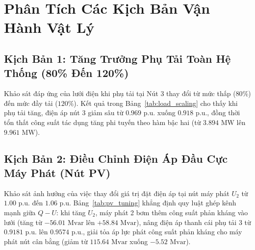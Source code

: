 \documentclass[12pt,a4paper,oneside]{report}
\begin{document}
\section{Phân Tích Các Kịch Bản Vận Hành Vật Lý}

\subsection{Kịch Bản 1: Tăng Trưởng Phụ Tải Toàn Hệ Thống (80\% Đến 120\%)}
Khảo sát đáp ứng của lưới điện khi phụ tải tại Nút 3 thay đổi từ mức thấp ($80\%$) đến mức đầy tải ($120\%$). Kết quả trong Bảng~\ref{tab:load_scaling} cho thấy khi phụ tải tăng, điện áp nút 3 giảm sâu từ $0.969\text{ p.u.}$ xuống $0.918\text{ p.u.}$, đồng thời tổn thất công suất tác dụng tăng phi tuyến theo hàm bậc hai (từ $3.894\text{ MW}$ lên $9.961\text{ MW}$).

\begin{table}[H]
\centering
\caption{Đáp ứng trào lưu công suất khi phụ tải hệ thống thay đổi.}
\label{tab:load_scaling}
\end{table}

\subsection{Kịch Bản 2: Điều Chỉnh Điện Áp Đầu Cực Máy Phát (Nút PV)}
Khảo sát ảnh hưởng của việc thay đổi giá trị đặt điện áp tại nút máy phát $U_2$ từ $1.00\text{ p.u.}$ đến $1.06\text{ p.u.}$ Bảng~\ref{tab:pv_tuning} khẳng định quy luật ghép kênh mạnh giữa $Q-U$: khi tăng $U_2$, máy phát 2 bơm thêm công suất phản kháng vào lưới (tăng từ $-56.01\text{ Mvar}$ lên $+58.84\text{ Mvar}$), nâng điện áp thanh cái phụ tải 3 từ $0.9181\text{ p.u.}$ lên $0.9574\text{ p.u.}$, giải tỏa áp lực phát công suất phản kháng cho máy phát nút cân bằng (giảm từ $115.64\text{ Mvar}$ xuống $-5.52\text{ Mvar}$).
\end{document}

